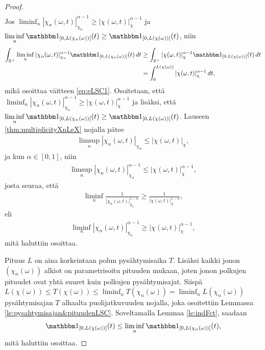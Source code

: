 \documentclass[12pt,oneside,a4paper]{amsbook} %
\begin{document}
\begin{proof}
\begin{align*}
    \end{align*}
    Jos $\displaystyle \liminf_n |\chi_n(\omega, t)|_{\chi_n}^{\alpha-1} \ge |\chi(\omega, t)|_{\chi}^{\alpha-1}$ ja $\displaystyle \liminf_n \indfct{[0, L(\chi_n(\omega))[}(t) \ge \indfct{[0, L(\chi(\omega))[}(t)$, niin
    \begin{align*}
        \int_\Rp \liminf_{n} |\chi_n(\omega, t)|_{\chi_n}^{\alpha-1} \indfct{[0, L(\chi_n(\omega))[}(t) \, dt &\ge \int_\Rp|\chi(\omega, t)|_{\chi}^{\alpha-1} \indfct{[0, L(\chi(\omega))[}(t) \, dt \\
        &= \int_0^{L(\chi(\omega))} |\chi(\omega, t)|_{\chi}^{\alpha-1} \, dt,
    \end{align*}
    mikä osoittaa väitteen \eqref{eq:eLSC1}. Osoitetaan, että $\displaystyle \liminf_n |\chi_n(\omega, t)|_{\chi_n}^{\alpha-1} \ge |\chi(\omega, t)|_{\chi}^{\alpha-1}$ ja lisäksi, että $\displaystyle \liminf_n \indfct{[0, L(\chi_n(\omega))[}(t) \ge \indfct{[0, L(\chi(\omega))[}(t)$.
    Lauseen \ref{thm:multiplicityXnLeX} nojalla pätee
    \begin{align*}
        \limsup_n|\chi_n(\omega, t)|_{\chi_n} \le |\chi(\omega, t)|_\chi,
    \end{align*}
    ja kun $\alpha \in [0, 1]$, niin 
    \begin{align*}
        \limsup_n|\chi_n(\omega, t)|_{\chi_n}^{\alpha-1} \le |\chi(\omega, t)|_\chi^{\alpha-1},
    \end{align*}
    josta seuraa, että
    \begin{align*}
        \liminf_n\frac{1}{|\chi_n(\omega, t)|_{\chi_n}^{1-\alpha}} \ge \frac{1}{|\chi(\omega, t)|_{\chi}^{1-\alpha}},
    \end{align*}
    eli
    \begin{align*}
        \liminf_n{|\chi_n(\omega, t)|_{\chi_n}^{\alpha-1}} \ge |\chi(\omega, t)|_{\chi}^{\alpha-1},
    \end{align*}
    mitä haluttiin osoittaa. 
    
    Pituus $L$ on aina korkeintaan polun pysähtymisaika $T$. Lisäksi kaikki jonon $(\chi_n(\omega))$ alkiot on parametrisoitu pituuden mukaan, joten jonon polkujen pituudet ovat yhtä suuret kuin polkujen pysähtymisajat. Siispä $L(\chi(\omega)) \le T(\chi(\omega)) \le \liminf_n T(\chi_n(\omega)) = \liminf_n L(\chi_n(\omega))$ pysähtymisajan $T$ alhaalta puolijatkuvuuden nojalla, joka osoitettiin Lemmassa \ref{le:pysahtymisajan&pituudenLSC}.  Soveltamalla Lemmaa \ref{le:indFct}, saadaan
    \begin{equation*}
        \indfct{[0, L(\chi(\omega))[}(t) \le \liminf_{n} \indfct{[0, L(\chi_n(\omega))[}(t),
    \end{equation*}
    mitä haluttiin osoittaa.
    

\end{proof}
\end{document}
